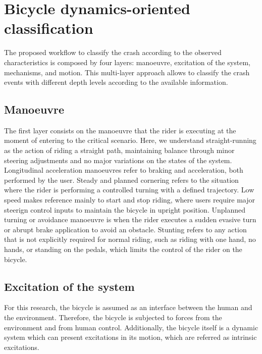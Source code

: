 \documentclass{article}
\begin{document}
\section{Bicycle dynamics-oriented classification}

The proposed workflow to classify the crash according to the observed characteristics is composed by four layers: manoeuvre, excitation of the system, mechanisms, and motion.
%
This multi-layer approach allows to classify the crash events with different depth levels according to the available information.
%


\subsection{Manoeuvre}

The first layer consists on the manoeuvre that the rider is executing at the moment of entering to the critical scenario.
%
Here, we understand straight-running as the action of riding a straight path, maintaining balance through minor steering adjustments and no major variations on the states of the system.
%
Longitudinal acceleration manoeuvres refer to braking and acceleration, both performed by the user.
%
Steady and planned cornering refers to the situation where the rider is performing a controlled turning with a defined trajectory.
%
Low speed makes reference mainly to start and stop riding, where users require major steerign control inputs to maintain the bicycle in upright position.
%
Unplanned turning or avoidance manoeuvre is when the rider executes a sudden evasive turn or abrupt brake application to avoid an obstacle.
%
Stunting refers to any action that is not explicitly required for normal riding, such as riding with one hand, no hands, or standing on the pedals, which limits the control of the rider on the bicycle.


\subsection{Excitation of the system}

For this research, the bicycle is assumed as an interface between the human and the environment.
%
Therefore, the bicycle is subjected to forces from the environment and from human control.
%
Additionally, the bicycle itself is a dynamic system which can present excitations in its motion, which are referred as intrinsic excitations.
\end{document}
